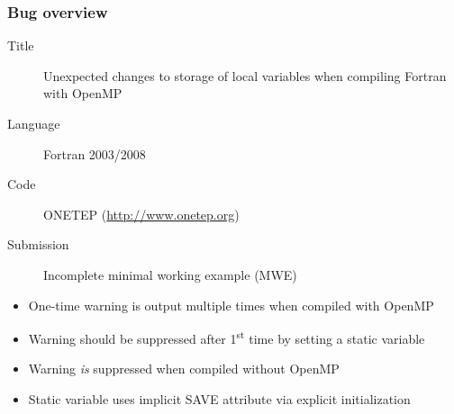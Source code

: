 \documentclass{beamer}
\begin{document}
\begin{frame}
  \frametitle{Bug overview}
    \begin{description}
      \item[Title] Unexpected changes to storage of local variables when compiling Fortran with OpenMP
      \item[Language] Fortran 2003/2008
      \item[Code] ONETEP (\url{http://www.onetep.org})
      \item[Submission] Incomplete minimal working example (MWE)
    \end{description}
    { \footnotesize
    \begin{itemize}
      \item One-time warning is output multiple times when compiled with OpenMP
      \item Warning should be suppressed after 1\textsuperscript{st} time by setting a static variable
      \item Warning \emph{is} suppressed when compiled without OpenMP
      \item Static variable uses implicit SAVE attribute via explicit initialization

\end{itemize}}
\end{frame}
\end{document}
